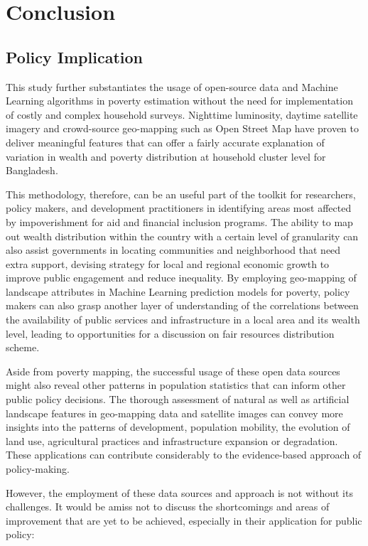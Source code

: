 \documentclass[solid,math,chem,code,plot,gloss]{bmc}
\begin{document}
\chapter{Conclusion}

\section{Policy Implication}

This study further substantiates the usage of open-source data and Machine Learning algorithms in poverty estimation without the need for implementation of costly and complex household surveys. Nighttime luminosity, daytime satellite imagery and crowd-source geo-mapping such as Open Street Map have proven to deliver meaningful features that can offer a fairly accurate explanation of variation in wealth and poverty distribution at household cluster level for Bangladesh. 

This methodology, therefore, can be an useful part of the toolkit for researchers, policy makers, and development practitioners in identifying areas most affected by impoverishment for aid and financial inclusion programs. The ability to map out wealth distribution within the country with a certain level of granularity can also assist governments in locating communities and neighborhood that need extra support, devising strategy for local and regional economic growth to improve public engagement and reduce inequality. By employing geo-mapping of landscape attributes in Machine Learning prediction models for poverty, policy makers can also grasp another layer of understanding of the correlations between the availability of public services and infrastructure in a local area and its wealth level, leading to opportunities for a discussion on fair resources distribution scheme.  

Aside from poverty mapping, the successful usage of these open data sources might also reveal other patterns in population statistics that can inform other public policy decisions. The thorough assessment of natural as well as artificial landscape features in geo-mapping data and satellite images can convey more insights into the patterns of development, population mobility, the evolution of land use, agricultural practices and infrastructure expansion or degradation. These applications can contribute considerably to the evidence-based approach of policy-making. 

However, the employment of these data sources and approach is not without its challenges. It would be amiss not to discuss the shortcomings and areas of improvement that are yet to be achieved, especially in their application for public policy: 
\end{document}
